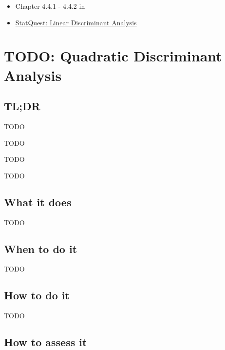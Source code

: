 \documentclass[
]{book}
\providecommand{\tightlist}{%
  \setlength{\itemsep}{0pt}\setlength{\parskip}{0pt}}
\begin{document}
\begin{itemize}
\tightlist
\item
  Chapter 4.4.1 - 4.4.2 in \citet{ISLR}
\item
  \href{https://www.youtube.com/watch?v=azXCzI57Yfc}{StatQuest: Linear Discriminant Analysis}
\end{itemize}

\hypertarget{quadratic-discriminant-analysis}{%
\chapter{TODO: Quadratic Discriminant Analysis}\label{quadratic-discriminant-analysis}}

\hypertarget{tldr-4}{%
\section{TL;DR}\label{tldr-4}}

\begin{description}
\tightlist
\item[What it does]
TODO
\item[When to do it]
TODO
\item[How to do it]
TODO
\item[How to assess it]
TODO
\end{description}

\hypertarget{what-it-does-4}{%
\section{What it does}\label{what-it-does-4}}

TODO

\hypertarget{when-to-do-it-4}{%
\section{When to do it}\label{when-to-do-it-4}}

TODO

\hypertarget{how-to-do-it-4}{%
\section{How to do it}\label{how-to-do-it-4}}

TODO

\hypertarget{how-to-assess-it-4}{%
\section{How to assess it}\label{how-to-assess-it-4}}
\end{document}
